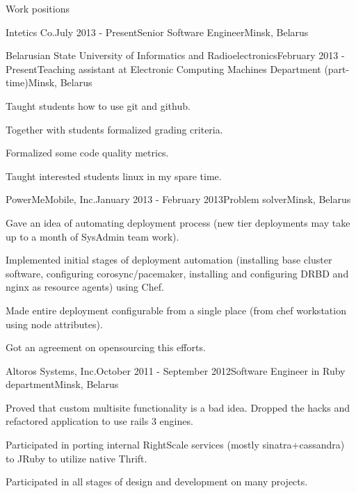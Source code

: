 \documentclass{resume} %
\begin{document}
\begin{rSection}{Work positions}

\begin{rSubsection}{Intetics Co.}{July 2013 - Present}{Senior Software Engineer}{Minsk, Belarus}
~
\end{rSubsection}

\begin{rSubsection}{Belarusian State University of Informatics and Radioelectronics}{February 2013 - Present}{Teaching assistant at Electronic Computing Machines Department (part-time)}{Minsk, Belarus}
\item Taught students how to use git and github.
\item Together with students formalized grading criteria.
\item Formalized some code quality metrics.
\item Taught interested students linux in my spare time.
\end{rSubsection}

\begin{rSubsection}{PowerMeMobile, Inc.}{January 2013 - February 2013}{Problem solver}{Minsk, Belarus}
\item Gave an idea of automating deployment process (new tier deployments may take up to
  a month of SysAdmin team work).
\item Implemented initial stages of deployment automation (installing base cluster software,
  configuring corosync/pacemaker, installing and configuring DRBD and nginx as resource agents) using Chef.
\item Made entire deployment configurable from a single place (from chef workstation using node attributes).
\item Got an agreement on opensourcing this efforts.
\end{rSubsection}

\begin{rSubsection}{Altoros Systems, Inc.}{October 2011 - September 2012}{Software Engineer in Ruby department}{Minsk, Belarus}
\item Proved that custom multisite functionality is a bad idea. Dropped the hacks and refactored application to use rails 3 engines.
\item Participated in porting internal RightScale services (mostly sinatra+cassandra) to JRuby to utilize native Thrift.
\item Participated in all stages of design and development on many projects.
\end{rSubsection}


\end{rSection}
\end{document}
